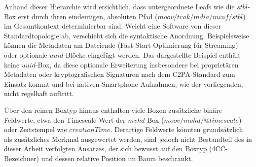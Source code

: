 Anhand dieser Hierarchie wird ersichtlich, dass untergeordnete Leafs wie die \(stbl\)-Box erst durch ihren eindeutigen, absoluten Pfad (\(moov/trak/mdia/minf/stbl\)) im Gesamtkontext determinierbar sind. Weicht eine Software von dieser Standardtopologie ab, verschiebt sich die syntaktische Anordnung. Beispielsweise können die Metadaten am Dateiende (Fast-Start-Optimierung für Streaming) oder optionale \(uuid\)-Blöcke eingefügt werden. Das dargestellte Beispiel enthält keine \(uuid\)-Box, da diese optionale Erweiterung insbesondere bei proprietären Metadaten oder kryptografischen Signaturen nach dem C2PA-Standard zum Einsatz kommt und bei nativen Smartphone-Aufnahmen, wie der vorliegenden, nicht regelhaft auftritt.

Über den reinen Boxtyp hinaus enthalten viele Boxen zusätzliche binäre Feldwerte, etwa den Timescale-Wert der \(mvhd\)-Box (\(moov/mvhd/@timescale\)) oder Zeitstempel wie \(creationTime\). Derartige Feldwerte könnten grundsätzlich als zusätzliches Merkmal ausgewertet werden, sind jedoch nicht Bestandteil des in dieser Arbeit verfolgten Ansatzes, der sich bewusst auf den Boxtyp (4CC-Bezeichner) und dessen relative Position im Baum beschränkt.